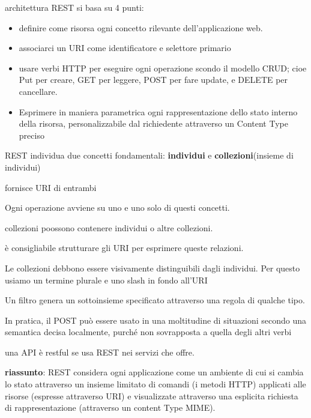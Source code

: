 \documentclass[12pt]{article}
\begin{document}
architettura REST si basa su 4 punti:
\begin{itemize}
\item definire come risorsa ogni concetto rilevante dell'applicazione web.
\item associarci un URI come identificatore e selettore primario
\item usare verbi HTTP per eseguire ogni operazione scondo il modello CRUD; cioe Put per creare, GET per leggere, POST per fare update, e DELETE per cancellare.
\item Esprimere in maniera parametrica ogni rappresentazione dello
stato interno della risorsa, personalizzabile dal richiedente
attraverso un Content Type preciso
\end{itemize}

REST individua due concetti fondamentali: \textbf{individui} e \textbf{collezioni}(insieme di individui)

fornisce URI di entrambi

Ogni operazione avviene su uno e uno solo di questi concetti.

collezioni poossono contenere individui o altre collezioni.

è consigliabile strutturare gli URI per esprimere queste relazioni.

Le collezioni debbono essere visivamente distinguibili
dagli individui. Per questo usiamo un termine plurale e
uno slash in fondo all'URI

Un filtro genera un sottoinsieme specificato attraverso
una regola di qualche tipo.

In pratica, il POST può essere usato in una moltitudine di
situazioni secondo una semantica decisa localmente, purché
non sovrapposta a quella degli altri verbi

una API è restful se usa REST nei servizi che offre.

\textbf{riassunto}: REST considera ogni applicazione come un ambiente di cui
si cambia lo stato attraverso un insieme limitato di comandi (i
metodi HTTP) applicati alle risorse (espresse attraverso URI)
e visualizzate attraverso una esplicita richiesta di
rappresentazione (attraverso un content Type MIME).
\end{document}
